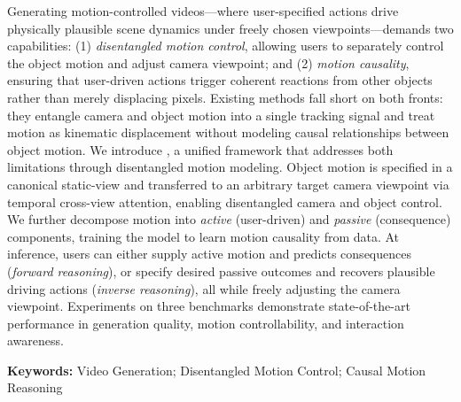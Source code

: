 Generating motion-controlled videos---where user-specified actions drive physically plausible scene dynamics under freely chosen viewpoints---demands two capabilities: (1) \emph{disentangled motion control}, allowing users to separately control the object motion and adjust camera viewpoint; and (2) \emph{motion causality}, ensuring that user-driven actions trigger coherent reactions from other objects rather than merely displacing pixels. Existing methods fall short on both fronts: they entangle camera and object motion into a single tracking signal and treat motion as kinematic displacement without modeling causal relationships between object motion. We introduce \ours, a unified framework that addresses both limitations through disentangled motion modeling. Object motion is specified in a canonical static-view and transferred to an arbitrary target camera viewpoint via temporal cross-view attention, enabling disentangled camera and object control. We further decompose motion into \emph{active} (user-driven) and \emph{passive} (consequence) components, training the model to learn motion causality from data. At inference, users can either supply active motion and \ours predicts consequences (\emph{forward reasoning}), or specify desired passive outcomes and \ours recovers plausible driving actions (\emph{inverse reasoning}), all while freely adjusting the camera viewpoint. Experiments on three benchmarks demonstrate state-of-the-art performance in generation quality, motion controllability, and interaction awareness.

\vspace{0.5em}
\noindent\textbf{Keywords:} Video Generation; Disentangled Motion Control; Causal Motion Reasoning
